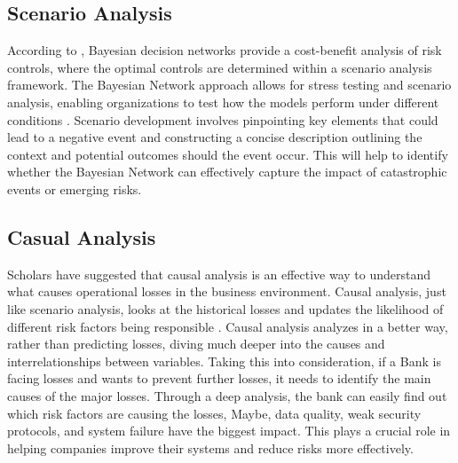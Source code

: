 \subsection{Scenario Analysis}
According to \textcite{fenton2010managing}, Bayesian decision networks provide a cost-benefit analysis of risk controls, where the optimal controls are determined within a scenario analysis framework. The Bayesian Network approach allows for stress testing and scenario analysis, enabling organizations to test how the models perform under different conditions \parencite{rippel_operational_2011}. Scenario development involves pinpointing key elements that could lead to a negative event and constructing a concise description outlining the context and potential outcomes should the event occur. This will help to identify whether the Bayesian Network can effectively capture the impact of catastrophic events or emerging risks.
\subsection{Casual Analysis}
Scholars have suggested that causal analysis is an effective way to understand what causes operational losses in the business environment. Causal analysis, just like scenario analysis, looks at the historical losses and updates the likelihood of different risk factors being responsible \parencite{andersen2016causal}. Causal analysis analyzes in a better way, rather than predicting losses, diving much deeper into the causes and interrelationships between variables. Taking this into consideration, if a Bank is facing losses and wants to prevent further losses, it needs to identify the main causes of the major losses.  Through a deep analysis, the bank can easily find out which risk factors are causing the losses, Maybe, data quality, weak security protocols, and system failure have the biggest impact. This plays a crucial role in helping companies improve their systems and reduce risks more effectively. 
